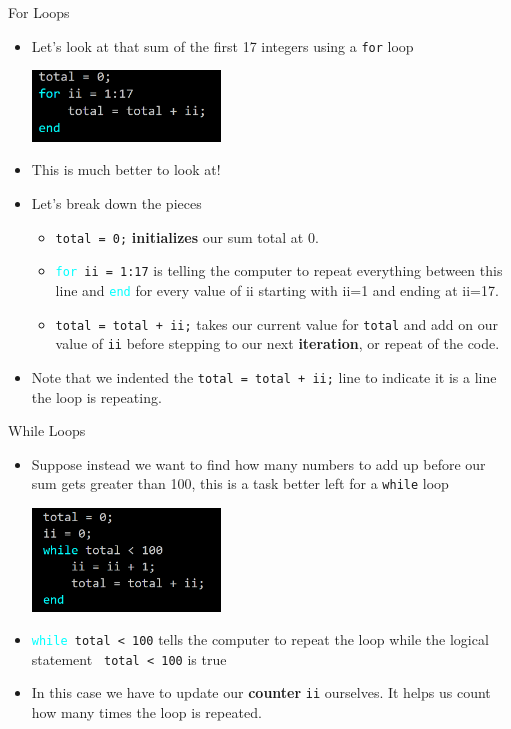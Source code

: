 {}\documentclass[letterpaper,
compress,
xcolor=x11names,
]{beamer}
\begin{document}
\begin{frame}{For Loops}
	\footnotesize
	\begin{itemize}
		\item Let's look at that sum of the first 17 integers using a \texttt{for} loop
		\begin{center}
			\includegraphics[width = 5cm]{for_example.png}
		\end{center}
		\item This is much better to look at!
		\item Let's break down the pieces
		\begin{itemize}
			\item \texttt{total = 0;} \textbf{initializes} our sum total at 0.
			\item \texttt{\textcolor{cyan}{for} ii = 1:17} is telling the computer to repeat everything between this line and \texttt{\textcolor{cyan}{end}} for every value of ii starting with ii=1 and ending at ii=17. 
			\item \texttt{total = total + ii;} takes our current value for \texttt{total} and add on our value of \texttt{ii} before stepping to our next \textbf{iteration}, or repeat of the code. 
		\end{itemize}
		\item Note that we indented the \texttt{total = total + ii;} line to indicate it is a line the loop is repeating.
	\end{itemize}
\end{frame}


\begin{frame}{While Loops}
	\footnotesize
	\begin{itemize}
		\item Suppose instead we want to find how many numbers to add up before our sum gets greater than 100, this is a task better left for a \texttt{while} loop
		\begin{center}
			\includegraphics[width = 5cm]{while_example.png}
		\end{center}
		\item \texttt{\textcolor{cyan}{while} total < 100} tells the computer to repeat the loop while the logical statement \texttt{ total < 100} is true
		\item In this case we have to update our \textbf{counter} \texttt{ii} ourselves. It helps us count how many times the loop is repeated.
	\end{itemize}
\end{frame}
\end{document}
